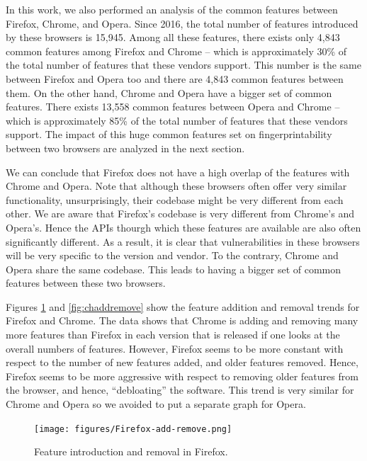   In this work, we also performed an analysis of the common features
  between Firefox, Chrome, and Opera. Since 2016, the total number of features
  introduced by these browsers is 15,945. Among all these features,
  there exists only 4,843 common features among Firefox and Chrome -- which is
  approximately 30\% of the total number of features that these
  vendors support. This number is the same between Firefox and Opera too and
  there are 4,843 common features between them. On the other hand, Chrome and Opera
  have a bigger set of common features. There exists 13,558 
  common features between Opera and Chrome -- which is approximately 85\% of the total
  number of features that these vendors support. The impact of this huge common features set
  on fingerprintability between two browsers are analyzed in the next section.

  We can conclude that Firefox does not have a high overlap of the features with Chrome and Opera.
  Note that although these browsers often offer very similar functionality,
  unsurprisingly, their codebase might be very different from each other.
  We are aware that Firefox's codebase is very different from Chrome's and Opera's.
  Hence the APIs thourgh which these features are available are also often
  significantly different. As a result, it is clear that
  vulnerabilities in these browsers will be very specific to the
  version and vendor. To the contrary, Chrome and Opera share the same codebase.
  This leads to having a bigger set of common features between these two browsers.

  Figures \ref{fig:ffaddremove} and \ref{fig:chaddremove} show the
  feature addition and removal trends for Firefox and Chrome. The data
  shows that Chrome is adding and removing many more features than
  Firefox in each version that is released if one looks at the overall
  numbers of features. However, Firefox seems to be more constant with
  respect to the number of new features added, and older features
  removed. Hence, Firefox seems to be more aggressive with respect to
  removing older features from the browser, and hence, ``debloating''
  the software. This trend is very similar for Chrome and Opera so we avoided
  to put a separate graph for Opera.

\begin{figure}[ht]
    \centering
    \texttt{[image: figures/Firefox-add-remove.png]}
    \caption{Feature introduction and removal in Firefox.}
    \label{fig:ffaddremove}
\end{figure}

